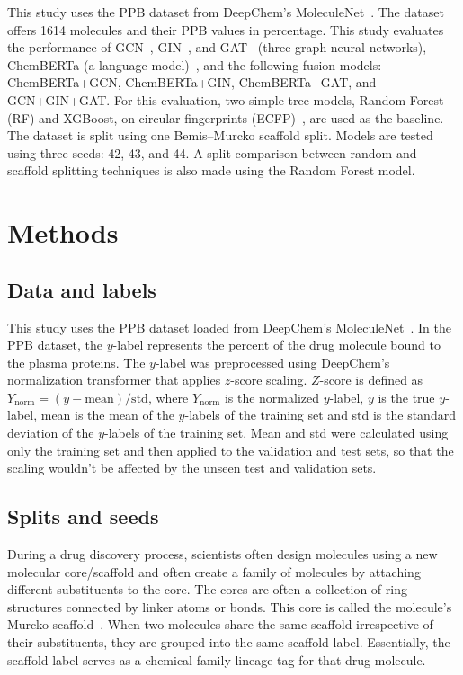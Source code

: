 \documentclass[11pt,a4paper]{article}
\begin{document}
This study uses the PPB dataset from DeepChem's MoleculeNet~\cite{wu2018moleculenet}.
The dataset offers 1614 molecules and their PPB values in percentage.
This study evaluates the performance of GCN~\cite{kipf2017gcn}, GIN~\cite{xu2019gin}, and GAT~\cite{velickovic2018gat} (three graph neural networks), ChemBERTa (a language model)~\cite{chithrananda2020chemberta}, and the following fusion models: ChemBERTa+GCN, ChemBERTa+GIN, ChemBERTa+GAT, and GCN+GIN+GAT.
For this evaluation, two simple tree models, Random Forest (RF) and XGBoost, on circular fingerprints (ECFP)~\cite{rogers2010ecfp}, are used as the baseline.
The dataset is split using one Bemis--Murcko scaffold split.
Models are tested using three seeds: 42, 43, and 44.
A split comparison between random and scaffold splitting techniques is also made using the Random Forest model.

\section{Methods}
\label{sec:methods}

\subsection{Data and labels}
This study uses the PPB dataset loaded from DeepChem's MoleculeNet~\cite{wu2018moleculenet,ramsundar2019deep}.
In the PPB dataset, the $y$-label represents the percent of the drug molecule bound to the plasma proteins.
The $y$-label was preprocessed using DeepChem's normalization transformer that applies $z$-score scaling.
$Z$-score is defined as $Y_{\mathrm{norm}} = (y - \mathrm{mean})/\mathrm{std}$, where $Y_{\mathrm{norm}}$ is the normalized $y$-label, $y$ is the true $y$-label, mean is the mean of the $y$-labels of the training set and std is the standard deviation of the $y$-labels of the training set.
Mean and std were calculated using only the training set and then applied to the validation and test sets, so that the scaling wouldn't be affected by the unseen test and validation sets.

\subsection{Splits and seeds}
During a drug discovery process, scientists often design molecules using a new molecular core/scaffold and often create a family of molecules by attaching different substituents to the core.
The cores are often a collection of ring structures connected by linker atoms or bonds.
This core is called the molecule's Murcko scaffold~\cite{bemis1996scaffold}.
When two molecules share the same scaffold irrespective of their substituents, they are grouped into the same scaffold label.
Essentially, the scaffold label serves as a chemical-family-lineage tag for that drug molecule.
\end{document}
